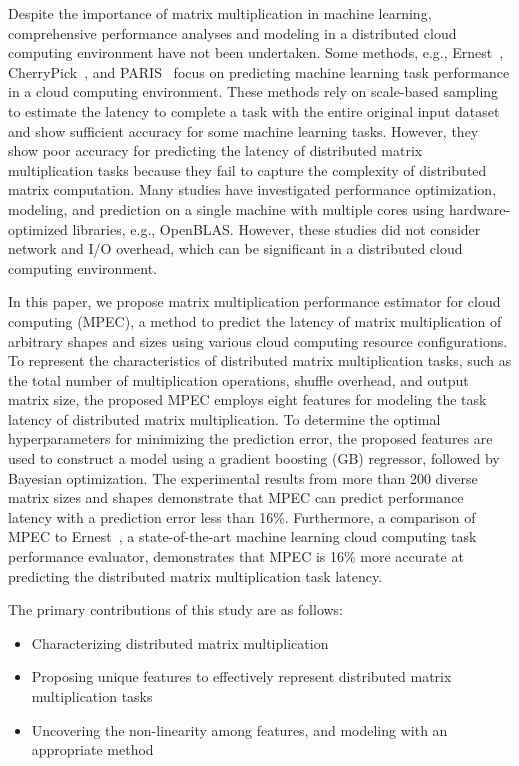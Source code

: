 \documentclass[10pt, conference, compsocconf]{IEEEtran}
\begin{document}
Despite the importance of matrix multiplication in machine learning, comprehensive performance analyses and modeling in a distributed cloud computing environment have not been undertaken. Some methods, e.g., Ernest~\cite{ernest}, CherryPick~\cite{cherrypick}, and PARIS~\cite{paris}  focus on predicting machine learning task performance in a cloud computing environment. These methods rely on scale-based sampling to estimate the latency to complete a task with the entire original input dataset and show sufficient accuracy for some machine learning tasks. However, they show poor accuracy for predicting the latency of distributed matrix multiplication tasks because they fail to capture the complexity of distributed matrix computation. Many studies have investigated performance optimization, modeling, and prediction on a single machine with multiple cores using hardware-optimized libraries, e.g., OpenBLAS. However, these studies did not consider network and I/O overhead, which can be significant in a distributed cloud computing environment.

In this paper, we propose matrix multiplication performance estimator for cloud computing (MPEC), a method to predict the latency of matrix multiplication of arbitrary shapes and sizes using various cloud computing resource configurations. To represent the characteristics of distributed matrix multiplication tasks, such as the total number of multiplication operations, shuffle overhead, and output matrix size, the proposed MPEC employs eight features for modeling the task latency of distributed matrix multiplication. To determine the optimal hyperparameters for minimizing the prediction error, the proposed features are used to construct a model using a gradient boosting (GB) regressor, followed by Bayesian optimization. The experimental results from more than 200 diverse matrix sizes and shapes demonstrate that MPEC can predict performance latency with a prediction error less than 16\%. Furthermore, a comparison of MPEC to Ernest~\cite{ernest}, a state-of-the-art machine learning cloud computing task performance evaluator, demonstrates that MPEC is 16\% more accurate at predicting the distributed matrix multiplication task latency.

The primary contributions of this study are as follows:
\begin{itemize}
  \item{Characterizing distributed matrix multiplication}
  \item{Proposing unique features to effectively represent distributed matrix multiplication tasks}
  \item{Uncovering the non-linearity among features, and modeling with an appropriate method}
\end{itemize}
\end{document}

